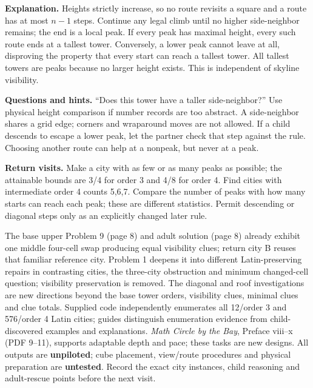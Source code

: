 \textbf{Explanation.} Heights strictly increase, so no route revisits a square and a route has at most $n-1$ steps. Continue any legal climb until no higher side-neighbor remains; the end is a local peak. If every peak has maximal height, every such route ends at a tallest tower. Conversely, a lower peak cannot leave at all, disproving the property that every start can reach a tallest tower. All tallest towers are peaks because no larger height exists. This is independent of skyline visibility.

\textbf{Questions and hints.} ``Does this tower have a taller side-neighbor?'' Use physical height comparison if number records are too abstract. A side-neighbor shares a grid edge; corners and wraparound moves are not allowed. If a child descends to escape a lower peak, let the partner check that step against the rule. Choosing another route can help at a nonpeak, but never at a peak.

\textbf{Return visits.} Make a city with as few or as many peaks as possible; the attainable bounds are 3/4 for order 3 and 4/8 for order 4. Find cities with intermediate order 4 counts 5,6,7. Compare the number of peaks with how many starts can reach each peak; these are different statistics. Permit descending or diagonal steps only as an explicitly changed later rule.

The base upper Problem 9 (page 8) and adult solution (page 8) already exhibit one middle four-cell swap producing equal visibility clues; return city B reuses that familiar reference city. Problem 1 deepens it into different Latin-preserving repairs in contrasting cities, the three-city obstruction and minimum changed-cell question; visibility preservation is removed. The diagonal and roof investigations are new directions beyond the base tower orders, visibility clues, minimal clues and clue totals. Supplied code independently enumerates all 12/order 3 and 576/order 4 Latin cities; guides distinguish enumeration evidence from child-discovered examples and explanations. \emph{Math Circle by the Bay}, Preface viii--x (PDF 9--11), supports adaptable depth and pace; these tasks are new designs. All outputs are \textbf{unpiloted}; cube placement, view/route procedures and physical preparation are \textbf{untested}. Record the exact city instances, child reasoning and adult-rescue points before the next visit.
